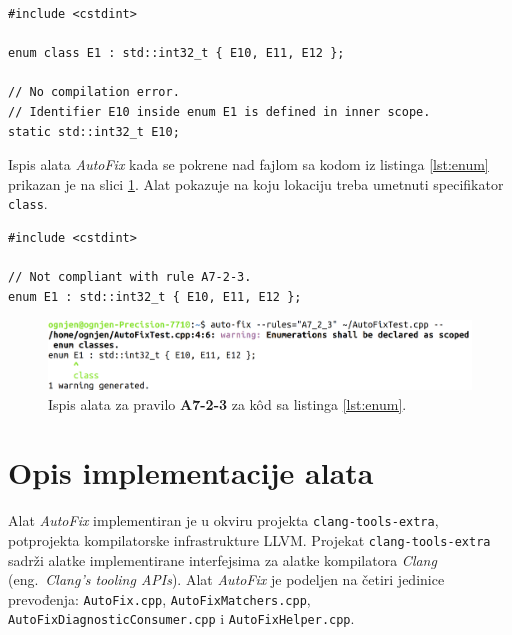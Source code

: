 \documentclass[12pt,oneside]{memoir}
\begin{document}
\begin{lstlisting}[style=customc, caption={Primer upotrebe sintakse \texttt{enum class}.}, label=lst:enumClassListing]
#include <cstdint>

enum class E1 : std::int32_t { E10, E11, E12 };

// No compilation error. 
// Identifier E10 inside enum E1 is defined in inner scope.
static std::int32_t E10; 
\end{lstlisting}


Ispis alata \textit{AutoFix} kada se pokrene nad fajlom sa kodom iz listinga \ref{lst:enum} prikazan je na slici \ref{fig:A7-2-3}. 
Alat pokazuje na koju lokaciju treba umetnuti specifikator \texttt{class}.
\\

\begin{lstlisting}[style=customc, caption={Primer koda koji nije napisan u skladu sa pravilom \textbf{A7-2-3}, odnosno ne koristi sintaksu \texttt{enum class}.}, label=lst:enum]
#include <cstdint>

// Not compliant with rule A7-2-3.
enum E1 : std::int32_t { E10, E11, E12 };

\end{lstlisting}


\begin{figure}[!h]
\begin{center}
\includegraphics[scale=0.22]{A7_2_3.png}
\end{center}
\caption{Ispis alata za pravilo \textbf{A7-2-3} za k\^{o}d sa listinga \ref{lst:enum}.}
\label{fig:A7-2-3}
\end{figure}

\section{Opis implementacije alata}

Alat \textit{AutoFix} implementiran je u okviru projekta \texttt{clang-tools-extra}, potprojekta kompilatorske infrastrukture LLVM. Projekat \texttt{clang-tools-extra} sadr\v{z}i alatke implementirane interfejsima za alatke kompilatora \textit{Clang} (eng.~\textit{Clang’s tooling APIs}).
Alat \textit{AutoFix} je podeljen na \v{c}etiri jedinice prevođenja: \texttt{AutoFix.cpp}, \texttt{AutoFix\-Matchers.cpp}, \texttt{AutoFixDiagnosticConsumer.cpp} i \texttt{AutoFixHelper.cpp}.
\end{document}
